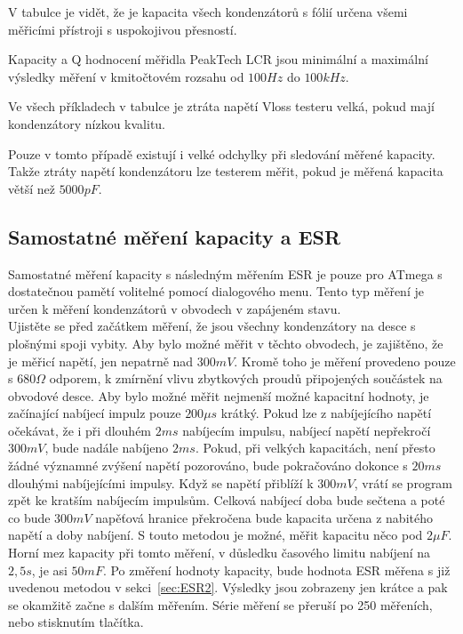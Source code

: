 V tabulce je vidět, že je kapacita všech kondenzátorů s fólií určena všemi měřicími přístroji s uspokojivou přesností.

Kapacity a Q hodnocení měřidla PeakTech LCR jsou minimální a maximální výsledky měření v kmitočtovém
rozsahu od \(100Hz\) do \(100kHz\).

Ve všech příkladech v tabulce je ztráta napětí Vloss testeru velká, pokud mají kondenzátory nízkou kvalitu.

Pouze v tomto případě existují i velké odchylky při sledování měřené kapacity.\\
Takže ztráty napětí kondenzátoru lze testerem měřit, pokud je měřená kapacita větší než \(5000pF\).

\subsection{Samostatné měření kapacity a ESR}
Samostatné měření kapacity s následným měřením ESR je pouze pro ATmega s dostatečnou pamětí
volitelné pomocí dialogového menu. Tento typ měření je určen k měření kondenzátorů v obvodech v zapájeném stavu.\\
Ujistěte se před začátkem měření, že jsou všechny kondenzátory na desce s plošnými spoji vybity. 
Aby bylo možné měřit v těchto obvodech, je zajištěno, že je měřicí napětí, jen nepatrně nad \(300mV\).
Kromě toho je měření provedeno pouze s \(680\Omega\) odporem, k zmírnění vlivu zbytkových proudů připojených součástek na obvodové desce.
Aby bylo možné měřit nejmenší možné kapacitní hodnoty, je začínající nabíjecí impulz pouze \(200\mu s\) krátký. Pokud lze z nabíjejícího napětí očekávat, že i při dlouhém \(2ms\) nabíjecím impulsu, nabíjecí napětí
nepřekročí \(300mV\), bude nadále nabíjeno \(2ms\). Pokud, při velkých kapacitách, není přesto žádné významné zvýšení napětí pozorováno, bude pokračováno dokonce s \(20ms\) dlouhými nabíjejícími impulsy. Když se  napětí přiblíží k \(300mV\), vrátí se program zpět ke kratším nabíjecím impulsům. Celková nabíjecí doba bude sečtena a poté co bude \(300mV\) napěťová hranice překročena bude kapacita určena z nabitého napětí a doby nabíjení.
S touto metodou je možné, měřit kapacitu něco pod \(2\mu F\). Horní mez kapacity při tomto měření,
v důsledku časového limitu nabíjení na \(2,5s\), je asi \(50mF\).
Po změření hodnoty kapacity, bude hodnota ESR měřena s již uvedenou metodou v sekci~\ref{sec:ESR2}.
Výsledky jsou zobrazeny jen krátce a pak se okamžitě začne s dalším měřením.
Série měření se přeruší po 250 měřeních, nebo stisknutím tlačítka.

